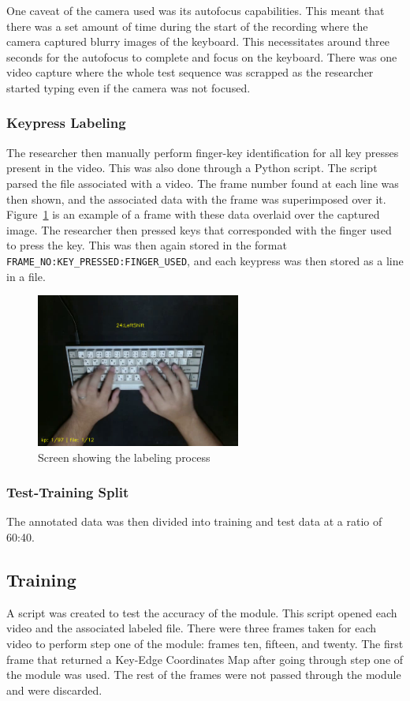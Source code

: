 \documentclass{report}
\begin{document}
One caveat of the camera used was its autofocus capabilities. This meant that
there was a set amount of time during the start of the recording where the
camera captured blurry images of the keyboard. This necessitates around three
seconds for the autofocus to complete and focus on the keyboard. There was one
video capture where the whole test sequence was scrapped as the researcher
started typing even if the camera was not focused.

\subsubsection{Keypress Labeling}
The researcher then manually perform finger-key identification for all key
presses present in the video. This was also done through a Python script. The
script parsed the file associated with a video. The frame number found at each
line was then shown, and the associated data with the frame was superimposed
over it. Figure~\ref{fig:metho-data-process} is an example of a frame with these
data overlaid over the captured image. The researcher then pressed keys that
corresponded with the finger used to press the key. This was then again stored
in the format \texttt{FRAME\_NO:KEY\_PRESSED:FINGER\_USED}, and each keypress
was then stored as a line in a file.

\begin{figure}[H]
	\centering
	\includegraphics[width=0.6\textwidth]{labeling.png}
	\caption{Screen showing the labeling process}
	\label{fig:metho-data-process}
	\centering
\end{figure}


\subsubsection{Test-Training Split}
The annotated data was then divided into training and test data at a ratio of
60:40.

\subsection{Training}
A script was created to test the accuracy of the module. This script opened each
video and the associated labeled file. There were three frames taken for each
video to perform step one of the module: frames ten, fifteen, and twenty. The
first frame that returned a Key-Edge Coordinates Map after going through step
one of the module was used. The rest of the frames were not passed through the
module and were discarded.
\end{document}
